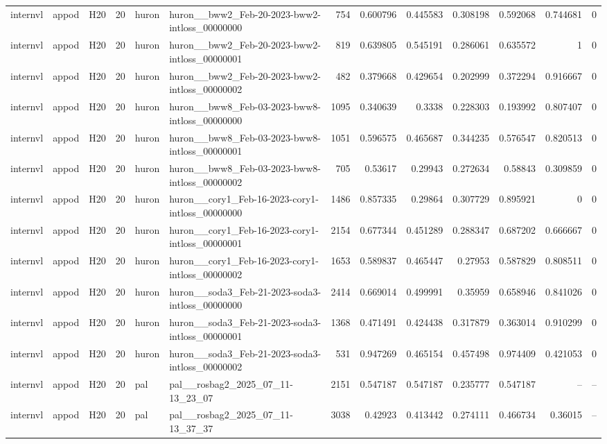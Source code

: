 \begin{longtable}{lllrllrrrrrrr}
internvl & appod & H20 & 20 & huron & huron\_\_bww2\_Feb-20-2023-bww2-intloss\_00000000 & 754 & 0.600796 & 0.445583 & 0.308198 & 0.592068 & 0.744681 & 0 \\
internvl & appod & H20 & 20 & huron & huron\_\_bww2\_Feb-20-2023-bww2-intloss\_00000001 & 819 & 0.639805 & 0.545191 & 0.286061 & 0.635572 & 1 & 0 \\
internvl & appod & H20 & 20 & huron & huron\_\_bww2\_Feb-20-2023-bww2-intloss\_00000002 & 482 & 0.379668 & 0.429654 & 0.202999 & 0.372294 & 0.916667 & 0 \\
internvl & appod & H20 & 20 & huron & huron\_\_bww8\_Feb-03-2023-bww8-intloss\_00000000 & 1095 & 0.340639 & 0.3338 & 0.228303 & 0.193992 & 0.807407 & 0 \\
internvl & appod & H20 & 20 & huron & huron\_\_bww8\_Feb-03-2023-bww8-intloss\_00000001 & 1051 & 0.596575 & 0.465687 & 0.344235 & 0.576547 & 0.820513 & 0 \\
internvl & appod & H20 & 20 & huron & huron\_\_bww8\_Feb-03-2023-bww8-intloss\_00000002 & 705 & 0.53617 & 0.29943 & 0.272634 & 0.58843 & 0.309859 & 0 \\
internvl & appod & H20 & 20 & huron & huron\_\_cory1\_Feb-16-2023-cory1-intloss\_00000000 & 1486 & 0.857335 & 0.29864 & 0.307729 & 0.895921 & 0 & 0 \\
internvl & appod & H20 & 20 & huron & huron\_\_cory1\_Feb-16-2023-cory1-intloss\_00000001 & 2154 & 0.677344 & 0.451289 & 0.288347 & 0.687202 & 0.666667 & 0 \\
internvl & appod & H20 & 20 & huron & huron\_\_cory1\_Feb-16-2023-cory1-intloss\_00000002 & 1653 & 0.589837 & 0.465447 & 0.27953 & 0.587829 & 0.808511 & 0 \\
internvl & appod & H20 & 20 & huron & huron\_\_soda3\_Feb-21-2023-soda3-intloss\_00000000 & 2414 & 0.669014 & 0.499991 & 0.35959 & 0.658946 & 0.841026 & 0 \\
internvl & appod & H20 & 20 & huron & huron\_\_soda3\_Feb-21-2023-soda3-intloss\_00000001 & 1368 & 0.471491 & 0.424438 & 0.317879 & 0.363014 & 0.910299 & 0 \\
internvl & appod & H20 & 20 & huron & huron\_\_soda3\_Feb-21-2023-soda3-intloss\_00000002 & 531 & 0.947269 & 0.465154 & 0.457498 & 0.974409 & 0.421053 & 0 \\
internvl & appod & H20 & 20 & pal & pal\_\_rosbag2\_2025\_07\_11-13\_23\_07 & 2151 & 0.547187 & 0.547187 & 0.235777 & 0.547187 & -- & -- \\
internvl & appod & H20 & 20 & pal & pal\_\_rosbag2\_2025\_07\_11-13\_37\_37 & 3038 & 0.42923 & 0.413442 & 0.274111 & 0.466734 & 0.36015 & -- \\

\end{longtable}
